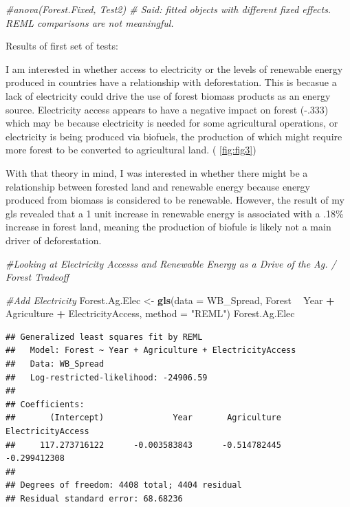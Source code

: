 \documentclass[12pt,]{article}
\newenvironment{Shaded}{\begin{snugshade}}{\end{snugshade}}
\newcommand{\KeywordTok}[1]{\textcolor[rgb]{0.13,0.29,0.53}{\textbf{#1}}}
\newcommand{\DataTypeTok}[1]{\textcolor[rgb]{0.13,0.29,0.53}{#1}}
\newcommand{\StringTok}[1]{\textcolor[rgb]{0.31,0.60,0.02}{#1}}
\newcommand{\CommentTok}[1]{\textcolor[rgb]{0.56,0.35,0.01}{\textit{#1}}}
\newcommand{\OperatorTok}[1]{\textcolor[rgb]{0.81,0.36,0.00}{\textbf{#1}}}
\newcommand{\NormalTok}[1]{#1}
\begin{document}
\begin{Shaded}
\begin{Highlighting}[]
\CommentTok{#anova(Forest.Fixed, Test2) # Said: fitted objects with different fixed effects. REML comparisons are not meaningful.}
\end{Highlighting}
\end{Shaded}

Results of first set of tests:

I am interested in whether access to electricity or the levels of
renewable energy produced in countries have a relationship with
deforestation. This is becasue a lack of electricity could drive the use
of forest biomass products as an energy source. Electricity access
appears to have a negative impact on forest (-.333) which may be because
electricity is needed for some agricultural operations, or electricity
is being produced via biofuels, the production of which might require
more forest to be converted to agricultural land. ( \ref{fig:fig3})

With that theory in mind, I was interested in whether there might be a
relationship between forested land and renewable energy because energy
produced from biomass is considered to be renewable. However, the result
of my gls revealed that a 1 unit increase in renewable energy is
associated with a .18\% increase in forest land, meaning the production
of biofule is likely not a main driver of deforestation.

\begin{Shaded}
\begin{Highlighting}[]
\CommentTok{#Looking at Electricity Accesss and Renewable Energy as a Drive of the Ag. / Forest Tradeoff}

\CommentTok{#Add Electricity }
\NormalTok{Forest.Ag.Elec <-}\StringTok{ }\KeywordTok{gls}\NormalTok{(}\DataTypeTok{data =}\NormalTok{ WB_Spread, }
\NormalTok{                    Forest }\OperatorTok{~}\StringTok{ }\NormalTok{Year }\OperatorTok{+}\StringTok{ }\NormalTok{Agriculture }\OperatorTok{+}\StringTok{ }\NormalTok{ElectricityAccess,}
                    \DataTypeTok{method =} \StringTok{"REML"}\NormalTok{)}
\NormalTok{Forest.Ag.Elec}
\end{Highlighting}
\end{Shaded}

\begin{verbatim}
## Generalized least squares fit by REML
##   Model: Forest ~ Year + Agriculture + ElectricityAccess 
##   Data: WB_Spread 
##   Log-restricted-likelihood: -24906.59
## 
## Coefficients:
##       (Intercept)              Year       Agriculture ElectricityAccess 
##     117.273716122      -0.003583843      -0.514782445      -0.299412308 
## 
## Degrees of freedom: 4408 total; 4404 residual
## Residual standard error: 68.68236
\end{verbatim}
\end{document}
